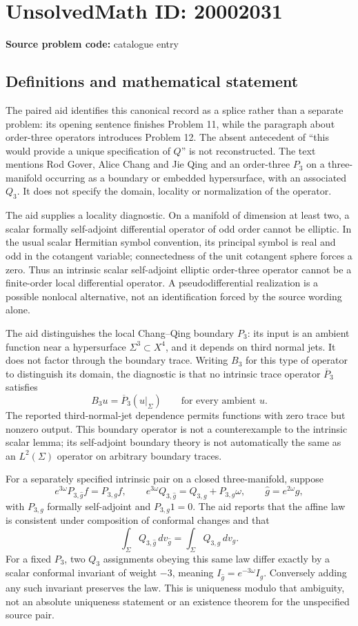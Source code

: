 \documentclass[11pt]{article}
\begin{document}
\section*{UnsolvedMath ID: 20002031}
\textbf{Source problem code:} catalogue entry
\subsection{Definitions and mathematical statement}
The paired aid identifies this canonical record as a splice rather than a separate problem: its opening sentence finishes Problem 11, while the paragraph about order-three operators introduces Problem 12. The absent antecedent of ``this would provide a unique specification of \(Q\)'' is not reconstructed. The text mentions Rod Gover, Alice Chang and Jie Qing and an order-three \(P_3\) on a three-manifold occurring as a boundary or embedded hypersurface, with an associated \(Q_3\). It does not specify the domain, locality or normalization of the operator.

The aid supplies a locality diagnostic. On a manifold of dimension at least two, a scalar formally self-adjoint differential operator of odd order cannot be elliptic. In the usual scalar Hermitian symbol convention, its principal symbol is real and odd in the cotangent variable; connectedness of the unit cotangent sphere forces a zero. Thus an intrinsic scalar self-adjoint elliptic order-three operator cannot be a finite-order local differential operator. A pseudodifferential realization is a possible nonlocal alternative, not an identification forced by the source wording alone.

The aid distinguishes the local Chang--Qing boundary \(P_3\): its input is an ambient function near a hypersurface \(\Sigma^3\subset X^4\), and it depends on third normal jets. It does not factor through the boundary trace. Writing \(B_3\) for this type of operator to distinguish its domain, the diagnostic is that no intrinsic trace operator \(\overline P_3\) satisfies
\[
 B_3u=\overline P_3(u|_\Sigma)\qquad\text{for every ambient }u.
\]
The reported third-normal-jet dependence permits functions with zero trace but nonzero output. This boundary operator is not a counterexample to the intrinsic scalar lemma; its self-adjoint boundary theory is not automatically the same as an \(L^2(\Sigma)\) operator on arbitrary boundary traces.

For a separately specified intrinsic pair on a closed three-manifold, suppose
\[
 e^{3\omega}P_{3,\widehat g}f=P_{3,g}f,\qquad
 e^{3\omega}Q_{3,\widehat g}=Q_{3,g}+P_{3,g}\omega,
 \qquad\widehat g=e^{2\omega}g,
\]
with \(P_{3,g}\) formally self-adjoint and \(P_{3,g}1=0\). The aid reports that the affine law is consistent under composition of conformal changes and that
\[
 \int_\Sigma Q_{3,\widehat g}\,dv_{\widehat g}
 =\int_\Sigma Q_{3,g}\,dv_g.
\]
For a fixed \(P_3\), two \(Q_3\) assignments obeying this same law differ exactly by a scalar conformal invariant of weight \(-3\), meaning
\(I_{\widehat g}=e^{-3\omega}I_g\). Conversely adding any such invariant preserves the law. This is uniqueness modulo that ambiguity, not an absolute uniqueness statement or an existence theorem for the unspecified source pair.
\end{document}
